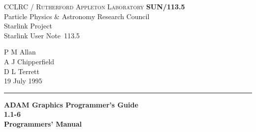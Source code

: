 \documentclass[twoside,11pt]{article}
\newcommand{\stardoccategory}  {Starlink User Note}
\newcommand{\stardocinitials}  {SUN}
\newcommand{\stardocnumber}    {113.5}
\newcommand{\stardocauthors}   {P M Allan\\A J Chipperfield\\D L Terrett}
\newcommand{\stardocdate}      {19 July 1995}
\newcommand{\stardoctitle}     {ADAM Graphics Programmer's Guide}
\newcommand{\stardocversion}   {1.1-6}
\newcommand{\stardocmanual}    {Programmers' Manual}
\newcommand{\stardocname}{\stardocinitials /\stardocnumber}
\newenvironment{latexonly}{}{}
\renewcommand{\_}{\texttt{\symbol{95}}}
\begin{document}
\thispagestyle{empty}

\begin{latexonly}
   CCLRC / \textsc{Rutherford Appleton Laboratory} \hfill \textbf{\stardocname}\\
   {\large Particle Physics \& Astronomy Research Council}\\
   {\large Starlink Project\\}
   {\large \stardoccategory\ \stardocnumber}
   \begin{flushright}
   \stardocauthors\\
   \stardocdate
   \end{flushright}
   \vspace{-4mm}
   \rule{\textwidth}{0.5mm}
   \vspace{5mm}
   \begin{center}
   {\Huge\textbf{\stardoctitle \\ [2.5ex]}}
   {\LARGE\textbf{\stardocversion \\ [4ex]}}
   {\Huge\textbf{\stardocmanual}}
   \end{center}
   \vspace{5mm}


\end{latexonly}
\end{document}
